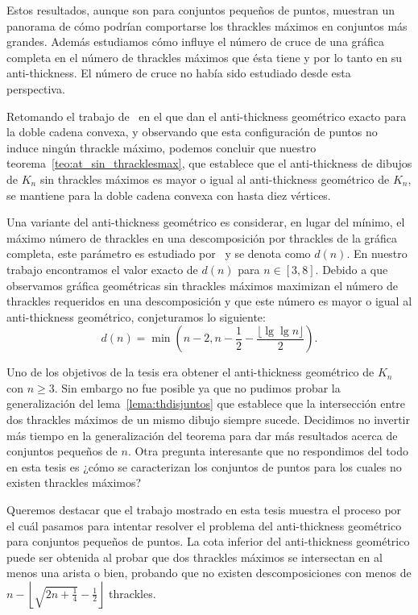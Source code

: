 Estos resultados, aunque son para conjuntos pequeños de puntos, muestran un panorama de cómo podrían
comportarse los thrackles máximos en conjuntos más grandes. Además estudiamos cómo influye el número de
cruce de una gráfica completa en el número de thrackles máximos que ésta tiene y por lo tanto en su
anti-thickness. El número de cruce no había sido estudiado desde esta perspectiva.

Retomando el trabajo de~\cite{Lomeli2018} en el que dan el anti-thickness geométrico exacto para la doble
cadena convexa, y observando que esta configuración de puntos no induce ningún thrackle máximo, podemos
concluir que nuestro teorema~\ref{teo:at_sin_thracklesmax}, que establece que el anti-thickness de dibujos
de $K_n$ sin thrackles máximos es mayor o igual al anti-thickness geométrico de $K_n$, se mantiene para la
doble cadena convexa con hasta diez vértices.

Una variante del anti-thickness geométrico es considerar, en lugar del mínimo, el máximo número de
thrackles en una descomposición por thrackles de la gráfica completa, este parámetro es estudiado
por~\cite{Araujo2005} y se denota como $d(n)$. En nuestro trabajo encontramos el valor exacto de $d(n)$
para $n \in [3,8]$. Debido a que observamos gráfica geométricas sin thrackles máximos maximizan el número de thrackles requeridos en una descomposición y que este número es mayor o igual al anti-thickness geométrico, conjeturamos lo siguiente:
\[
d(n) =  \min\left(n-2,n-\frac{1}{2}-\frac{\lfloor \lg \lg n\rfloor}{2}\right).
\]

Uno de los objetivos de la tesis era obtener el anti-thickness geométrico de $K_n$ con $n\geq 3$. Sin
embargo no fue posible ya que no pudimos probar la generalización del lema~\ref{lema:thdisjuntos} que
establece que la intersección entre dos thrackles máximos de un mismo dibujo siempre sucede. Decidimos no
invertir más tiempo en la generalización del teorema para dar más resultados acerca de conjuntos pequeños de
$n$. Otra pregunta interesante que no respondimos del todo en esta tesis es ¿cómo se caracterizan los
conjuntos de puntos para los cuales no existen thrackles máximos?

Queremos destacar que el trabajo mostrado en esta tesis muestra el proceso por el cuál pasamos para
intentar resolver el problema del anti-thickness geométrico para conjuntos pequeños de puntos. La cota
inferior del anti-thickness geométrico puede ser obtenida al probar que dos thrackles máximos se
intersectan en al menos una arista o bien, probando que no existen descomposiciones con menos de $n -
\left\lfloor \sqrt{2n + \frac{1}{4}} - \frac{1}{2}\right\rfloor$ thrackles.


